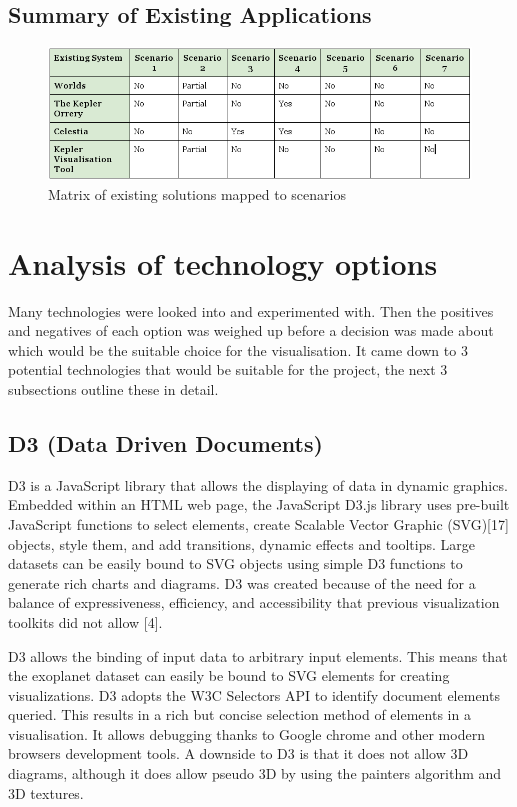\subsection{Summary of Existing Applications}
\begin{figure}[H]
  \centering
      \includegraphics[width=1\textwidth]{images/existing.png}
  \caption{Matrix of existing solutions mapped to scenarios}  
    \label{fig:existing}
\end{figure}


\section{Analysis of technology options}
Many technologies were looked into and experimented with. Then the positives and
negatives of each option was weighed up before a decision was made about which would be the
suitable choice for the visualisation. It came down to 3 potential technologies that
would be suitable for the project, the next 3 subsections outline these in
detail.

\subsection{D3 (Data Driven Documents)}
D3 is a JavaScript library that allows the displaying of data in dynamic
graphics. Embedded
within an HTML web page, the JavaScript D3.js library uses pre-built JavaScript
functions to
select elements, create Scalable Vector Graphic (SVG)[17] objects, style them,
and add transitions,
dynamic effects and tooltips. Large datasets can be easily bound to SVG objects
using
simple D3 functions to generate rich charts and diagrams. D3 was created because
of the
need for a balance of expressiveness, efficiency, and accessibility that
previous visualization
toolkits did not allow [4].

D3 allows the binding of input data to arbitrary input elements. This means that
the exoplanet dataset can easily be bound to SVG elements for creating visualizations. D3
adopts the W3C Selectors API to identify document elements queried. This results in a
rich but concise selection method of elements in a visualisation. It allows debugging thanks to Google chrome and other modern browsers
development tools. A downside to D3 is that it does not allow 3D diagrams, although it does
allow pseudo 3D by using the painters algorithm and 3D textures.

